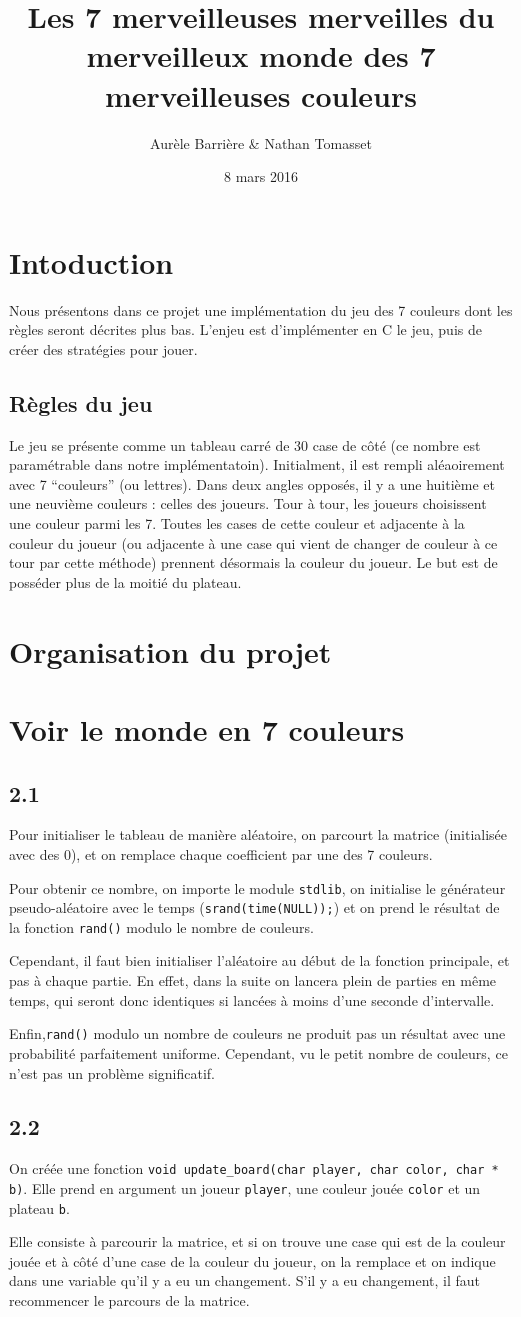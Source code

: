 \documentclass[12pt]{article}
\title{Les 7 merveilleuses merveilles du merveilleux monde des 7 merveilleuses couleurs}
\author{Aurèle Barrière \& Nathan Tomasset}
\date{8 mars 2016}
\def\question#1{\subsection*{#1}}
\def\sec#1{\section*{#1}}
\begin{document}
\maketitle

\sec{Intoduction}
Nous présentons dans ce projet une implémentation du jeu des 7 couleurs dont les règles seront décrites plus bas. L'enjeu est d'implémenter en C le jeu, puis de créer des stratégies pour jouer.

\question{Règles du jeu}
Le jeu se présente comme un tableau carré de 30 case de côté (ce nombre est paramétrable dans notre implémentatoin). Initialment, il est rempli aléaoirement avec 7 ``couleurs'' (ou lettres). Dans deux angles opposés, il y a une huitième et une neuvième couleurs : celles des joueurs. Tour à tour, les joueurs choisissent une couleur parmi les 7. Toutes les cases de cette couleur et adjacente à la couleur du joueur (ou adjacente à une case qui vient de changer de couleur à ce tour par cette méthode) prennent désormais la couleur du joueur. Le but est de posséder plus de la moitié du plateau.

\sec{Organisation du projet}



\sec{Voir le monde en 7 couleurs}
\question{2.1} 
Pour initialiser le tableau de manière aléatoire, on parcourt la matrice (initialisée avec des 0), et on remplace chaque coefficient par une des 7 couleurs.

Pour obtenir ce nombre, on importe le module \texttt{stdlib}, on initialise le générateur pseudo-aléatoire avec le temps (\texttt{srand(time(NULL));}) et on prend le résultat de la fonction \texttt{rand()} modulo le nombre de couleurs.

Cependant, il faut bien initialiser l'aléatoire au début de la fonction principale, et pas à chaque partie. En effet, dans la suite on lancera plein de parties en même temps, qui seront donc identiques si lancées à moins d'une seconde d'intervalle.

Enfin,\texttt{rand()} modulo un nombre de couleurs ne produit pas un résultat avec une probabilité parfaitement uniforme. %
Cependant, vu le petit nombre de couleurs, ce n'est pas un problème significatif.

\question{2.2}
On créée une fonction \texttt{void update\_board(char player, char color, char * b)}. Elle prend en argument un joueur \texttt{player}, une couleur jouée \texttt{color} et un plateau \texttt{b}.

Elle consiste à parcourir la matrice, et si on trouve une case qui est de la couleur jouée et à côté d'une case de la couleur du joueur, on la remplace et on indique dans une variable qu'il y a eu un changement.
S'il y a eu changement, il faut recommencer le parcours de la matrice. 
\end{document}
